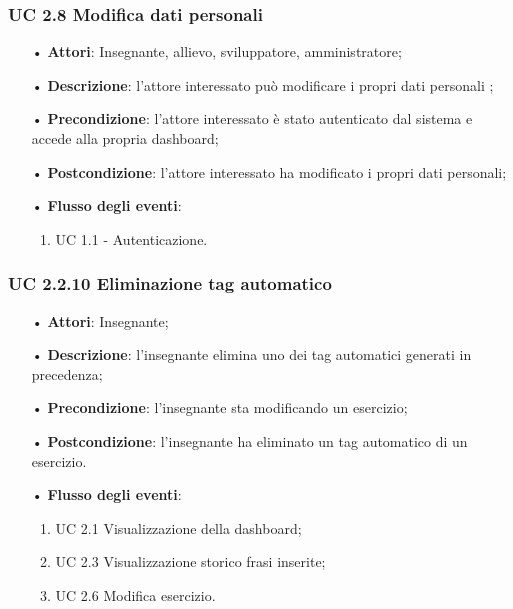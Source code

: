 \subsubsection{UC 2.8 Modifica dati personali}
\begin{itemize}
	\item[•] \textbf{Attori}: Insegnante, allievo, sviluppatore, amministratore;
	\item[•] \textbf{Descrizione}: l'attore interessato può modificare i propri dati personali ;
	\item[•] \textbf{Precondizione}: l'attore interessato è stato autenticato dal sistema e accede alla propria dashboard;
	\item[•] \textbf{Postcondizione}: l'attore interessato ha modificato i propri dati personali;
	\item[•] \textbf{Flusso degli eventi}:
		\begin{enumerate}
		\item UC 1.1 - Autenticazione.
	\end{enumerate}
\end{itemize}

\subsubsection{UC 2.2.10 Eliminazione tag automatico}
\begin{itemize}
	\item[•] \textbf{Attori}: Insegnante;
	\item[•] \textbf{Descrizione}: l'insegnante elimina uno dei tag automatici generati in precedenza;
	\item[•] \textbf{Precondizione}: l'insegnante sta modificando un esercizio;
	\item[•] \textbf{Postcondizione}: l'insegnante ha eliminato un tag automatico di un esercizio.
	\item[•] \textbf{Flusso degli eventi}: 
		\begin{enumerate}
		\item UC 2.1 Visualizzazione della dashboard;
		\item UC 2.3 Visualizzazione storico frasi inserite;
		\item UC 2.6 Modifica esercizio.
	\end{enumerate}
\end{itemize}